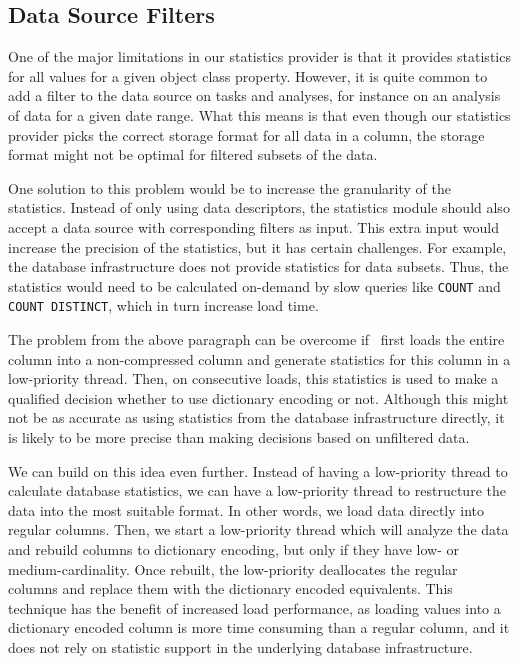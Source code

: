
\subsection{Data Source Filters}
\label{sub:Data Source Filters}
One of the major limitations in our statistics provider is that it provides statistics for all values for a given object class property. However, it is quite common to add a filter to the data source on tasks and analyses, for instance on an analysis of data for a given date range. What this means is that even though our statistics provider picks the correct storage format for all data in a column, the storage format might not be optimal for filtered subsets of the data.

One solution to this problem would be to increase the granularity of the statistics. Instead of only using data descriptors, the statistics module should also accept a data source with corresponding filters as input. This extra input would increase the precision of the statistics, but it has certain challenges. For example, the database infrastructure does not provide statistics for data subsets. Thus, the statistics would need to be calculated on-demand by slow queries like \texttt{COUNT} and \texttt{COUNT DISTINCT}, which in turn increase load time.

The problem from the above paragraph can be overcome if \gap~first loads the entire column into a non-compressed column and generate statistics for this column in a low-priority thread. Then, on consecutive loads, this statistics is used to make a qualified decision whether to use dictionary encoding or not. Although this might not be as accurate as using statistics from the database infrastructure directly, it is likely to be more precise than making decisions based on unfiltered data. 

We can build on this idea even further. Instead of having a low-priority thread to calculate database statistics, we can have a low-priority thread to restructure the data into the most suitable format. In other words, we load data directly into regular columns. Then, we start a low-priority thread which will analyze the data and rebuild columns to dictionary encoding, but only if they have low- or medium-cardinality. Once rebuilt, the low-priority deallocates the regular columns and replace them with the dictionary encoded equivalents. This technique has the benefit of increased load performance, as loading values into a dictionary encoded column is more time consuming than a regular column, and it does not rely on statistic support in the underlying database infrastructure.

